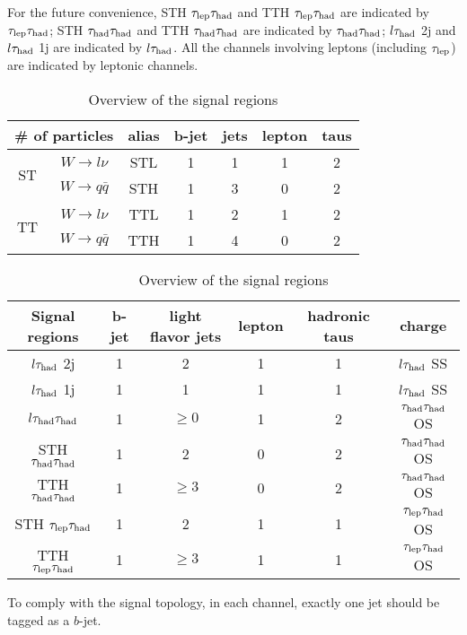 For the future convenience, STH $\tau_\text{lep}{}\tau_\text{had}$ and TTH $\tau_\text{lep}{}\tau_\text{had}$ are indicated by $\tau_\text{lep}{}\tau_\text{had}$; STH $\tau_\text{had}{}\tau_\text{had}$ and TTH $\tau_\text{had}{}\tau_\text{had}$ are indicated by $\tau_\text{had}{}\tau_\text{had}$; $l\tau_\text{had}$ 2j and $l\tau_\text{had}$ 1j are indicated by $l\tau_\text{had}$. All the channels involving leptons (including $\tau_\text{lep}$) are indicated by leptonic channels.

\begin{table}
\footnotesize
\centering
\caption{Overview of the final states of signal events}
\label{tab:signalevents}
\begin{tabular}[h]{c|c|c|c|c|c|c}
\hline \hline

\multicolumn{2}{c|}{\# of particles}	& alias & b-jet & jets & lepton & taus\\ \hline
\multirow{2}{*}{ST}	& $W\to l\nu$		& STL   & 1	    & 1    & 1      & 2   \\ \cline{2-7}
					& $W\to q\bar{q}$	& STH   & 1	    & 3    & 0      & 2   \\ \hline
\multirow{2}{*}{TT}	& $W\to l\nu$		& TTL   & 1	    & 2    & 1      & 2   \\ \cline{2-7}
					& $W\to q\bar{q}$	& TTH   & 1	    & 4    & 0      & 2   \\ \hline
\end{tabular}
\footnotesize
\centering
\caption{Overview of the signal regions}
\label{tab:signalregions}
\begin{tabular}[h]{c|c|c|c|c|c}
\hline \hline
Signal regions & b-jet & light flavor jets	& lepton & hadronic taus & charge\\ \hline
$l\tau_\text{had}$ 2j  & 1     & 2					& 1      & 1			 & $l\tau_\text{had}$ SS\\ \hline
$l\tau_\text{had}$ 1j  & 1     & 1					& 1      & 1			 & $l\tau_\text{had}$ SS\\ \hline
$l\tau_\text{had}{}\tau_\text{had}$	   & 1     & $\ge0$ 			& 1      & 2             & $\tau_\text{had}{}\tau_\text{had}$ OS\\ \hline
STH $\tau_\text{had}{}\tau_\text{had}$ & 1     & 2      			& 0      & 2             & $\tau_\text{had}{}\tau_\text{had}$ OS\\ \hline
TTH $\tau_\text{had}{}\tau_\text{had}$ & 1     & $\ge3$ 			& 0      & 2             & $\tau_\text{had}{}\tau_\text{had}$ OS\\ \hline
STH $\tau_\text{lep}{}\tau_\text{had}$   & 1     & 2      			& 1      & 1             & $\tau_\text{lep}{}\tau_\text{had}$ OS\\ \hline
TTH $\tau_\text{lep}{}\tau_\text{had}$   & 1     & $\ge3$ 			& 1      & 1             & $\tau_\text{lep}{}\tau_\text{had}$ OS\\ \hline
\end{tabular}
\end{table}

To comply with the signal topology, in each channel, exactly one jet should be tagged as a $b$-jet. 

